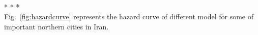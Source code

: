 ~\\
* * *
\\

Fig.~\ref{fig:hazardcurve} represents the hazard curve of different model for some of important northern cities in Iran. 











